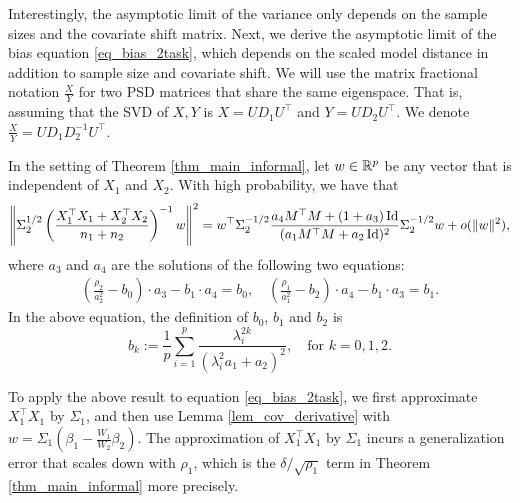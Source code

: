 Interestingly, the asymptotic limit of the variance only depends on the sample sizes and the covariate shift matrix.
Next, we derive the asymptotic limit of the bias equation \eqref{eq_bias_2task}, which depends on the scaled model distance in addition to sample size and covariate shift. %
We will use the matrix fractional notation $\frac{X}{Y}$ for two PSD matrices that share the same eigenspace.
That is, assuming that the SVD of $X, Y$ is $X = U D_1 U^{\top}$ and $Y = U D_2 U^{\top}$.
We denote $\frac{X}{Y} = U D_{1} D_2^{-1} U^{\top}$.

\begin{lemma}\label{lem_cov_derivative}
In the setting of Theorem \ref{thm_main_informal}, let $w \in \mathbb{R}^p$ be any vector that is independent of $X_1$ and $X_2$.
With high probability, we have that
\begin{equation}\label{lem_cov_derv_eq}
\begin{split}
\left\| \Sigma_2^{1/2} \left({\frac{X_1^{\top}X_1 + X_2^{\top}X_2}{n_1 + n_2}}\right)^{-1} w \right\|^2
= w^{\top} \Sigma_2^{-1/2}  \frac{a_4 {M}^{\top}{M} + (1 + a_3)\operatorname{Id}}{(a_1 {M}^{\top}{M}+a_2\operatorname{Id})^2} \Sigma_2^{-1/2} w + o(\|w\|^2),
\end{split}
\end{equation}
where $a_{3}$ and $a_4$ are the solutions of the following two equations:
\begin{gather}\label{eq_a34extra}
		\left(\frac{\rho_2}{a_2^{2}}-  b_0\right)\cdot  a_3 - b_1 \cdot  a_4
		= b_0, \quad \left(\frac{\rho_1}{a_1^{2}} -  b_2  \right)\cdot  a_4 -  b_1 \cdot  a_3 = b_1 .
	\end{gather}
In the above equation, the definition of $b_0$, $b_1$ and $b_2$ is
$$ b_k:= \frac1{p}\sum_{i=1}^p \frac{\lambda_i^{2k}}{ (\lambda_i^2 a_1 + a_2)^2  },\quad  \text{for } k=0,1,2.$$
\end{lemma}
To apply the above result to equation \eqref{eq_bias_2task}, we first approximate $X_1^{\top}X_1$ by $\Sigma_1$, and then use Lemma \ref{lem_cov_derivative} with $w = \Sigma_1 (\beta_1 - \frac{W_1}{W_2} \beta_2)$.
The approximation of $X_1^{\top}X_1$ by $\Sigma_1$ incurs a generalization error that scales down with $\rho_1$, which is the $\delta / \sqrt{\rho_1}$ term in Theorem \ref{thm_main_informal} more precisely.

